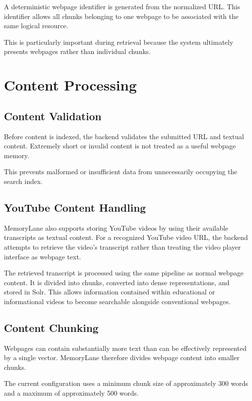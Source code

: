 \documentclass{tietreport}
\begin{document}
A deterministic webpage identifier is generated from the
normalized URL. This identifier allows all chunks belonging to
one webpage to be associated with the same logical resource.

This is particularly important during retrieval because the
system ultimately presents webpages rather than individual
chunks.

\section{Content Processing}

\subsection{Content Validation}

Before content is indexed, the backend validates the submitted
URL and textual content. Extremely short or invalid content is
not treated as a useful webpage memory.

This prevents malformed or insufficient data from unnecessarily
occupying the search index.

\subsection{YouTube Content Handling}

MemoryLane also supports storing YouTube videos by using their
available transcripts as textual content. For a recognized YouTube
video URL, the backend attempts to retrieve the video's transcript
rather than treating the video player interface as webpage text.

The retrieved transcript is processed using the same pipeline as
normal webpage content. It is divided into chunks, converted into
dense representations, and stored in Solr. This allows information
contained within educational or informational videos to become
searchable alongside conventional webpages.

\subsection{Content Chunking}

Webpages can contain substantially more text than can be
effectively represented by a single vector. MemoryLane
therefore divides webpage content into smaller chunks.

The current configuration uses a minimum chunk size of
approximately 300 words and a maximum of approximately
500 words.
\end{document}
